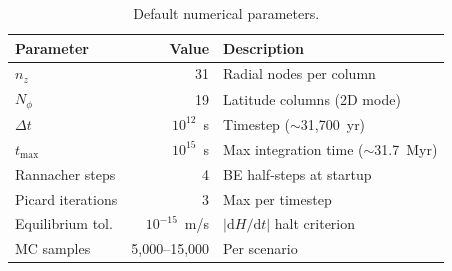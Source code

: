 \documentclass[11pt,a4paper]{article}
\newcommand{\dd}{\mathrm{d}}
\begin{document}
\begin{table}[h]
\centering
\caption{Default numerical parameters.}
\label{tab:numerical}
\begin{tabular}{lrl}
\toprule
\textbf{Parameter} & \textbf{Value} & \textbf{Description} \\
\midrule
$n_z$               & 31        & Radial nodes per column \\
$N_\phi$            & 19        & Latitude columns (2D mode) \\
$\Delta t$          & $10^{12}$~s & Timestep ($\sim$31,700~yr) \\
$t_{\mathrm{max}}$  & $10^{15}$~s & Max integration time ($\sim$31.7~Myr) \\
Rannacher steps     & 4         & BE half-steps at startup \\
Picard iterations   & 3         & Max per timestep \\
Equilibrium tol.    & $10^{-15}$~m/s & $|\dd H/\dd t|$ halt criterion \\
MC samples          & 5,000--15,000 & Per scenario \\
\bottomrule
\end{tabular}
\end{table}
\end{document}

